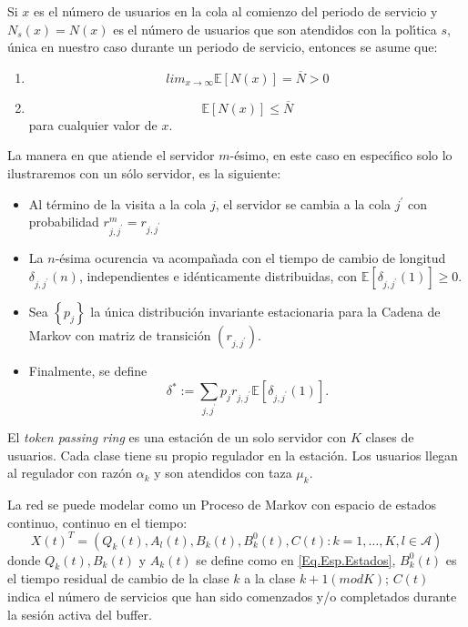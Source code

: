 \documentclass{article}
\newcommand{\esp}{\mathbb{E}}
\numberwithin{equation}{section}
\begin{document}
Si $x$ es el n{\'u}mero de usuarios en la cola al comienzo del
periodo de servicio y $N_{s}\left(x\right)=N\left(x\right)$ es el
n{\'u}mero de usuarios que son atendidos con la pol{\'\i}tica $s$,
{\'u}nica en nuestro caso durante un periodo de servicio, entonces
se asume que:
\begin{enumerate}
\item
\begin{equation}\label{S1}
lim_{x\rightarrow\infty}\esp\left[N\left(x\right)\right]=\overline{N}>0
\end{equation}
\item
\begin{equation}\label{S2}
\esp\left[N\left(x\right)\right]\leq \overline{N} \end{equation}
para cualquier valor de $x$.
\end{enumerate}
La manera en que atiende el servidor $m$-{\'e}simo, en este caso
en espec{\'\i}fico solo lo ilustraremos con un s{\'o}lo servidor,
es la siguiente:
\begin{itemize}
\item Al t{\'e}rmino de la visita a la cola $j$, el servidor se
cambia a la cola $j^{'}$ con probabilidad
$r_{j,j^{'}}^{m}=r_{j,j^{'}}$

\item La $n$-{\'e}sima ocurencia va acompa{\~n}ada con el tiempo
de cambio de longitud $\delta_{j,j^{'}}\left(n\right)$,
independientes e id{\'e}nticamente distribuidas, con
$\esp\left[\delta_{j,j^{'}}\left(1\right)\right]\geq0$.

\item Sea $\left\{p_{j}\right\}$ la {\'u}nica distribuci{\'o}n
invariante estacionaria para la Cadena de Markov con matriz de
transici{\'o}n $\left(r_{j,j^{'}}\right)$.

\item Finalmente, se define
\begin{equation}
\delta^{*}:=\sum_{j,j^{'}}p_{j}r_{j,j^{'}}\esp\left[\delta_{j,j^{'}}\left(1\right)\right].
\end{equation}
\end{itemize}

El {\em token passing ring} es una estaci\'on de un solo servidor
con $K$ clases de usuarios. Cada clase tiene su propio regulador
en la estaci\'on. Los usuarios llegan al regulador con raz\'on
$\alpha_{k}$ y son atendidos con taza $\mu_{k}$.

La red se puede modelar como un Proceso de Markov con espacio de
estados continuo, continuo en el tiempo:
\begin{equation}
 X\left(t\right)^{T}=\left(Q_{k}\left(t\right),A_{l}\left(t\right),B_{k}\left(t\right),B_{k}^{0}\left(t\right),C\left(t\right):k=1,\ldots,K,l\in\mathcal{A}\right)
\end{equation}
donde $Q_{k}\left(t\right), B_{k}\left(t\right)$ y
$A_{k}\left(t\right)$ se define como en \ref{Eq.Esp.Estados},
$B_{k}^{0}\left(t\right)$ es el tiempo residual de cambio de la
clase $k$ a la clase $k+1\left(mod K\right)$; $C\left(t\right)$
indica el n\'umero de servicios que han sido comenzados y/o
completados durante la sesi\'on activa del buffer.
\end{document}
